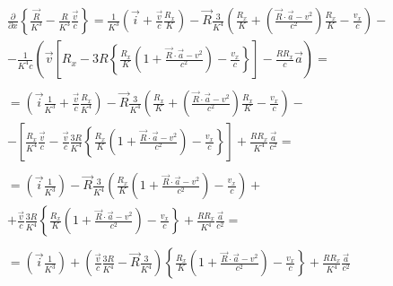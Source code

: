 \documentclass[11pt]{article}
\begin{document}
\begin{align}
  & \frac{\partial }{\partial x}\left\{ \frac{\overrightarrow{R}}{{{K}^{3}}}-\frac{R}{{{K}^{3}}}\frac{\overrightarrow{v}}{c} \right\}=\frac{1}{{{K}^{3}}}\left( \overrightarrow{i}+\frac{\overrightarrow{v}}{c}\frac{{{R}_{x}}}{K} \right)-\overrightarrow{R}\frac{3}{{{K}^{4}}}\left( \frac{{{R}_{x}}}{K}+\left( \frac{\overrightarrow{R}\cdot \overrightarrow{a}-{{v}^{2}}}{{{c}^{2}}} \right)\frac{{{R}_{x}}}{K}-\frac{{{v}_{x}}}{c} \right)- \\ 
 & -\frac{1}{{{K}^{4}}c}\left( \overrightarrow{v}\left[ {{R}_{x}}-3R\left\{ \frac{{{R}_{x}}}{K}\left( 1+\frac{\overrightarrow{R}\cdot \overrightarrow{a}-{{v}^{2}}}{{{c}^{2}}} \right)-\frac{{{v}_{x}}}{c} \right\} \right]-\frac{R{{R}_{x}}}{c}\overrightarrow{a} \right)= \\ 
 &  \\ 
 & =\left( \overrightarrow{i}\frac{1}{{{K}^{3}}}+\frac{\overrightarrow{v}}{c}\frac{{{R}_{x}}}{{{K}^{4}}} \right)-\overrightarrow{R}\frac{3}{{{K}^{4}}}\left( \frac{{{R}_{x}}}{K}+\left( \frac{\overrightarrow{R}\cdot \overrightarrow{a}-{{v}^{2}}}{{{c}^{2}}} \right)\frac{{{R}_{x}}}{K}-\frac{{{v}_{x}}}{c} \right)- \\ 
 & -\left[ \frac{{{R}_{x}}}{{{K}^{4}}}\frac{\overrightarrow{v}}{c}-\frac{\overrightarrow{v}}{c}\frac{3R}{{{K}^{4}}}\left\{ \frac{{{R}_{x}}}{K}\left( 1+\frac{\overrightarrow{R}\cdot \overrightarrow{a}-{{v}^{2}}}{{{c}^{2}}} \right)-\frac{{{v}_{x}}}{c} \right\} \right]+\frac{R{{R}_{x}}}{{{K}^{4}}}\frac{\overrightarrow{a}}{{{c}^{2}}}= \\ 
 &  \\ 
 & =\left( \overrightarrow{i}\frac{1}{{{K}^{3}}} \right)-\overrightarrow{R}\frac{3}{{{K}^{4}}}\left( \frac{{{R}_{x}}}{K}\left( 1+\frac{\overrightarrow{R}\cdot \overrightarrow{a}-{{v}^{2}}}{{{c}^{2}}} \right)-\frac{{{v}_{x}}}{c} \right)+ \\ 
 & +\frac{\overrightarrow{v}}{c}\frac{3R}{{{K}^{4}}}\left\{ \frac{{{R}_{x}}}{K}\left( 1+\frac{\overrightarrow{R}\cdot \overrightarrow{a}-{{v}^{2}}}{{{c}^{2}}} \right)-\frac{{{v}_{x}}}{c} \right\}+\frac{R{{R}_{x}}}{{{K}^{4}}}\frac{\overrightarrow{a}}{{{c}^{2}}}= \\ 
 &  \\ 
 & =\left( \overrightarrow{i}\frac{1}{{{K}^{3}}} \right)+\left( \frac{\overrightarrow{v}}{c}\frac{3R}{{{K}^{4}}}-\overrightarrow{R}\frac{3}{{{K}^{4}}} \right)\left\{ \frac{{{R}_{x}}}{K}\left( 1+\frac{\overrightarrow{R}\cdot \overrightarrow{a}-{{v}^{2}}}{{{c}^{2}}} \right)-\frac{{{v}_{x}}}{c} \right\}+\frac{R{{R}_{x}}}{{{K}^{4}}}\frac{\overrightarrow{a}}{{{c}^{2}}} \\ 
\end{align}
\end{document}
